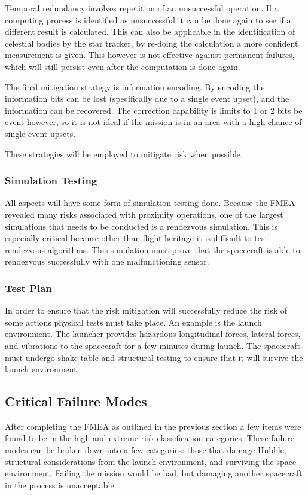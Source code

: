 \documentclass[paper=letter, fontsize=11pt]{scrartcl} %
\numberwithin{equation}{section} %
\numberwithin{figure}{section} %
\numberwithin{table}{section} %
\begin{document}
Temporal redundancy involves repetition of an unsuccessful operation. If a computing process is identified as unsuccessful it can be done again to see if a different result is calculated. This can also be applicable in the identification of celestial bodies by the star tracker, by re-doing the calculation a more confident measurement is given. This however is not effective against permanent failures, which will still persist even after the computation is done again.

The final mitigation strategy is information encoding. By encoding the information bits can be lost (specifically due to a single event upset), and the information can be recovered. The correction capability is limits to 1 or 2 bits be event however, so it is not ideal if the mission is in an area with a high chance of single event upsets.

These strategies will be employed to mitigate risk when possible.

\subsubsection{Simulation Testing}
All aspects will have some form of simulation testing done. Because the FMEA revealed many risks associated with proximity operations, one of the largest simulations that needs to be conducted is a rendezvous simulation. This is especially critical because other than flight heritage it is difficult to test rendezvous algorithms. This simulation must prove that the spacecraft is able to rendezvous successfully with one malfunctioning sensor.

\subsubsection{Test Plan}
In order to ensure that the risk mitigation will successfully reduce the risk of some actions physical tests must take place. An example is the launch environment. The launcher provides hazardous longitudinal forces, lateral forces, and vibrations to the spacecraft for a few minutes during launch. The spacecraft must undergo shake table and structural testing to ensure that it will survive the launch environment.

\subsection{Critical Failure Modes}
After completing the FMEA as outlined in the previous section a few items were found to be in the high and extreme risk classification categories. These failure modes can be broken down into a few categories: those that damage Hubble, structural considerations from the launch environment, and surviving the space environment. Failing the mission would be bad, but damaging another spacecraft in the process is unacceptable.
\end{document}
